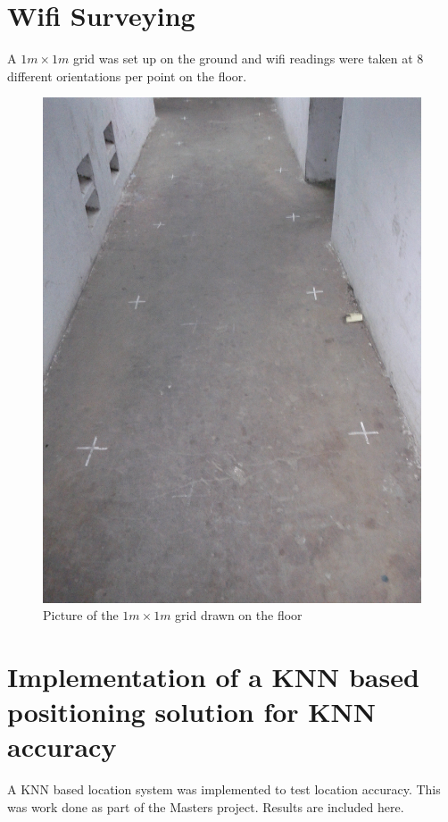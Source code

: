 \section{Wifi Surveying}

A $1m \times 1m$ grid was set up on the ground and wifi readings were taken at 8
different orientations per point on the floor.


\begin{figure}
    \centering
    \includegraphics[width=5in,angle=270]{figures/grid_pic}
    \caption{Picture of the $1m \times 1m$ grid drawn on the floor}
\end{figure}

\section{Implementation of a KNN based positioning solution for KNN accuracy\label{sec:knn_pos}}

A KNN based location system was implemented to test location accuracy. 
This was work done as part of the Masters project. Results are included here.

